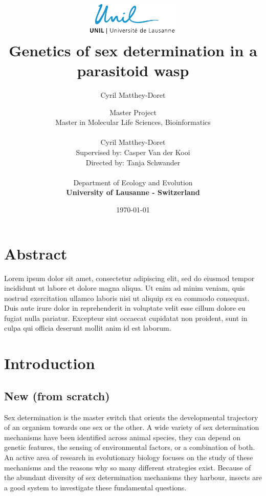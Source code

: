 \documentclass[11pt,a4paper]{report}
\author{Cyril Matthey-Doret}
\title{
\includegraphics[width=1.75in]{lo_unil06_bleu.pdf} \\
\vspace*{1in}
\textbf{Genetics of sex determination in a parasitoid wasp}}
\author{\Large{Master Project}\\
		Master in Molecular Life Sciences, Bioinformatics\\
				\vspace*{0.5in} \\
		Cyril Matthey-Doret\\
        Supervised by: Casper Van der Kooi\\
        Directed by: Tanja Schwander\\
		\vspace*{0.5in} \\
		Department of Ecology and Evolution\\
        \textbf{University of Lausanne - Switzerland}\\
       } \date{\today}
\begin{document}
\renewcommand{\headrulewidth}{1pt}
\maketitle

\section*{Abstract}
Lorem ipsum dolor sit amet, consectetur adipiscing elit, sed do eiusmod tempor incididunt ut labore et dolore magna aliqua. Ut enim ad minim veniam, quis nostrud exercitation ullamco laboris nisi ut aliquip ex ea commodo consequat. Duis aute irure dolor in reprehenderit in voluptate velit esse cillum dolore eu fugiat nulla pariatur. Excepteur sint occaecat cupidatat non proident, sunt in culpa qui officia deserunt mollit anim id est laborum.

\section*{Introduction}

\subsection*{New (from scratch)}

Sex determination is the master switch that orients the developmental trajectory of an organism towards one sex or the other. A wide variety of sex determination mechanisms have been identified across animal species, they can depend on genetic features, the sensing of environmental factors, or a combination of both. An active area of research in evolutionary biology focuses on the study of these mechanisms and the reasons why so many different strategies exist. Because of the abundant diversity of sex determination mechanisms they harbour, insects are a good system to investigate these fundamental questions.
\end{document}
